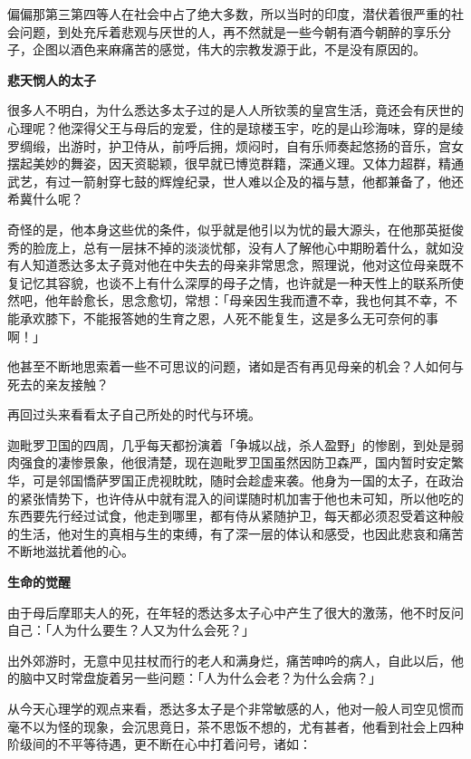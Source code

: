 \documentclass[twoside,openany]{book}
\newcommand{\mt}[1]{\textbullet \textbf{#1}}
\begin{document}
偏偏那第三第四等人在社会中占了绝大多数，所以当时的印度，潜伏着很严重的社会问题，到处充斥着悲观与厌世的人，再不然就是一些今朝有酒今朝醉的享乐分子，企图以酒色来麻痛苦的感觉，伟大的宗教发源于此，不是没有原因的。

\mt{悲天悯人的太子}

很多人不明白，为什么悉达多太子过的是人人所钦羡的皇宫生活，竟还会有厌世的心理呢？他深得父王与母后的宠爱，住的是琼楼玉宇，吃的是山珍海味，穿的是绫罗绸缎，出游时，护卫侍从，前呼后拥，烦闷时，自有乐师奏起悠扬的音乐，宫女摆起美妙的舞姿，因天资聪颖，很早就已博览群籍，深通义理。又体力超群，精通武艺，有过一箭射穿七鼓的辉煌纪录，世人难以企及的福与慧，他都兼备了，他还希冀什么呢？

奇怪的是，他本身这些优的条件，似乎就是他引以为忧的最大源头，在他那英挺俊秀的脸庞上，总有一层抹不掉的淡淡忧郁，没有人了解他心中期盼着什么，就如没有人知道悉达多太子竟对他在中失去的母亲非常思念，照理说，他对这位母亲既不复记忆其容貌，也谈不上有什么深厚的母子之情，也许就是一种天性上的联系所使然吧，他年龄愈长，思念愈切，常想：「母亲因生我而遭不幸，我也何其不幸，不能承欢膝下，不能报答她的生育之恩，人死不能复生，这是多么无可奈何的事啊！」

他甚至不断地思索着一些不可思议的问题，诸如是否有再见母亲的机会？人如何与死去的亲友接触？

再回过头来看看太子自己所处的时代与环境。

迦毗罗卫国的四周，几乎每天都扮演着「争城以战，杀人盈野」的惨剧，到处是弱肉强食的凄惨景象，他很清楚，现在迦毗罗卫国虽然因防卫森严，国内暂时安定繁华，可是邻国憍萨罗国正虎视眈眈，随时会趁虚来袭。他身为一国的太子，在政治的紧张情势下，也许侍从中就有混入的间谍随时机加害于他也未可知，所以他吃的东西要先行经过试食，他走到哪里，都有侍从紧随护卫，每天都必须忍受着这种般的生活，他对生的真相与生的束缚，有了深一层的体认和感受，也因此悲哀和痛苦不断地滋扰着他的心。

\mt{生命的觉醒}

由于母后摩耶夫人的死，在年轻的悉达多太子心中产生了很大的激荡，他不时反问自己：「人为什么要生？人又为什么会死？」

出外郊游时，无意中见拄杖而行的老人和满身烂，痛苦呻吟的病人，自此以后，他的脑中又时常盘旋着另一些问题：「人为什么会老？为什么会病？」

从今天心理学的观点来看，悉达多太子是个非常敏感的人，他对一般人司空见惯而毫不以为怪的现象，会沉思竟日，茶不思饭不想的，尤有甚者，他看到社会上四种阶级间的不平等待遇，更不断在心中打着问号，诸如：
\end{document}
